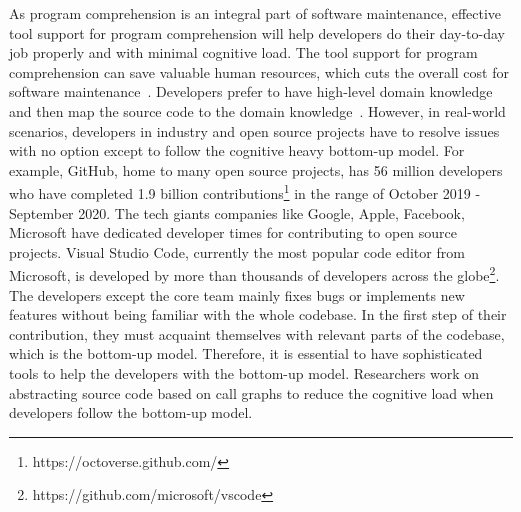  As program comprehension is an integral part of software maintenance, effective tool support for program comprehension will help developers do their day-to-day job properly and with minimal cognitive load. The tool support for program comprehension can save valuable human resources, which cuts the overall cost for software maintenance~\cite{kruger2019features}. Developers prefer to have high-level domain knowledge and then map the source code to the domain knowledge~\cite{brooks1983theoryComprehensionPrograms}. However, in real-world scenarios, developers in industry and open source projects have to resolve issues with no option except to follow the cognitive heavy bottom-up model. For example, GitHub, home to many open source projects, has 56 million developers who have completed 1.9 billion contributions\footnote{https://octoverse.github.com/} in the range of October 2019 - September 2020. The tech giants companies like Google, Apple, Facebook, Microsoft have dedicated developer times for contributing to open source projects. Visual Studio Code, currently the most popular code editor from Microsoft, is developed by more than thousands of developers across the globe\footnote{https://github.com/microsoft/vscode}. The developers except the core team mainly fixes bugs or implements new features without being familiar with the whole codebase. In the first step of their contribution, they must acquaint themselves with relevant parts of the codebase, which is the bottom-up model. Therefore, it is essential to have sophisticated tools to help the developers with the bottom-up model. Researchers work on abstracting source code based on call graphs to reduce the cognitive load when developers follow the bottom-up model. 


